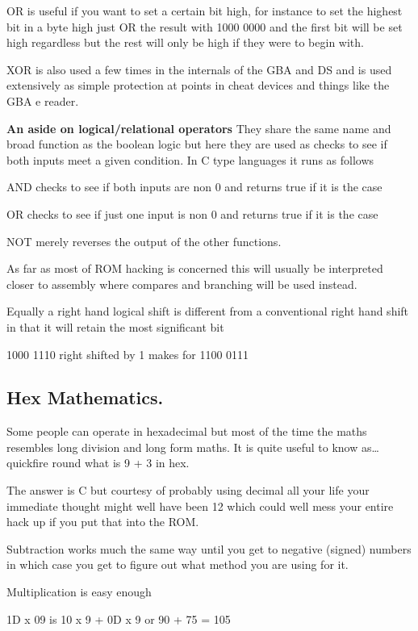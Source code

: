 \documentclass[
]{book}
\begin{document}
OR is useful if you want to set a certain bit high, for instance to set the highest bit in a byte high just OR the result with 1000 0000 and the first bit will be set high regardless but the rest will only be high if they were to begin with.

XOR is also used a few times in the internals of the GBA and DS and is used extensively as simple protection at points in cheat devices and things like the GBA e reader.

\textbf{An aside on logical/relational operators} They share the same name and broad function as the boolean logic but here they are used as checks to see if both inputs meet a given condition. In C type languages it runs as follows

AND checks to see if both inputs are non 0 and returns true if it is the case

OR checks to see if just one input is non 0 and returns true if it is the case

NOT merely reverses the output of the other functions.

As far as most of ROM hacking is concerned this will usually be interpreted closer to assembly where compares and branching will be used instead.

Equally a right hand logical shift is different from a conventional right hand shift in that it will retain the most significant bit

1000 1110 right shifted by 1 makes for 1100 0111

\hypertarget{hex-mathematics.}{%
\subsection{Hex Mathematics.}\label{hex-mathematics.}}

Some people can operate in hexadecimal but most of the time the maths resembles long division and long form maths. It is quite useful to know as\ldots{} quickfire round what is 9 + 3 in hex.

The answer is C but courtesy of probably using decimal all your life your immediate thought might well have been 12 which could well mess your entire hack up if you put that into the ROM.

Subtraction works much the same way until you get to negative (signed) numbers in which case you get to figure out what method you are using for it.

Multiplication is easy enough

1D x 09 is 10 x 9 + 0D x 9 or 90 + 75 = 105
\end{document}
